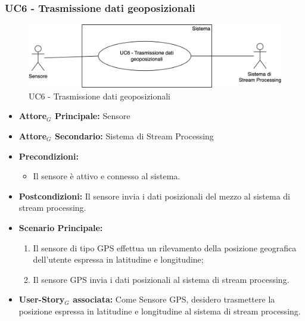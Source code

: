 \documentclass[11pt]{article}
\begin{document}
\begin{justify}
\subsubsection{\textbf{UC6 - Trasmissione dati geoposizionali}}
\begin{figure}[H]
    \centering
    \includegraphics[width=0.7\linewidth]{UC6image.png}
    \caption{UC6 - Trasmissione dati geoposizionali}
    \label{fig:UC6}
\end{figure}
\label{UC6}
\begin{itemize}
    \item \textbf{Attore$_G$ Principale:} Sensore
    \item \textbf{Attore$_G$ Secondario:} Sistema di Stream Processing
    \item \textbf{Precondizioni:} 
        \begin{itemize}
    	\item Il sensore è attivo e connesso al sistema.
        \end{itemize}
    \item \textbf{Postcondizioni:} Il sensore invia i dati posizionali del mezzo al sistema di stream processing.
    \item \textbf{Scenario Principale:} 
        \begin{enumerate}
            \item Il sensore di tipo GPS effettua un rilevamento della posizione geografica dell'utente espressa in latitudine e longitudine;
            \item Il sensore GPS invia i dati posizionali al sistema di stream processing.
        \end{enumerate}
    \item \textbf{User-Story$_G$ associata:} Come Sensore GPS, desidero trasmettere la posizione espressa in latitudine e longitudine al sistema di stream processing.

\end{itemize}



\end{justify}
\end{document}
